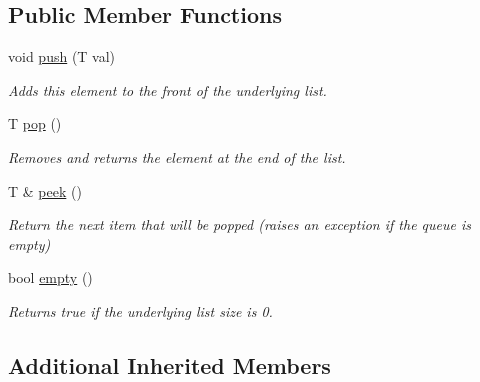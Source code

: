 \subsection*{Public Member Functions}
\begin{DoxyCompactItemize}
\item 
\mbox{\label{classssuds_1_1_queue_a6b7fb3efa5a83edba42e034dc378962f}} 
void \mbox{\hyperlink{classssuds_1_1_queue_a6b7fb3efa5a83edba42e034dc378962f}{push}} (T val)
\begin{DoxyCompactList}\small\item\em Adds this element to the front of the underlying list. \end{DoxyCompactList}\item 
\mbox{\label{classssuds_1_1_queue_a3fc08471d690c2d0cca591bc9773b517}} 
T \mbox{\hyperlink{classssuds_1_1_queue_a3fc08471d690c2d0cca591bc9773b517}{pop}} ()
\begin{DoxyCompactList}\small\item\em Removes and returns the element at the end of the list. \end{DoxyCompactList}\item 
\mbox{\label{classssuds_1_1_queue_a805e78bc8e4ba73d0fa35e387917cbf8}} 
T \& \mbox{\hyperlink{classssuds_1_1_queue_a805e78bc8e4ba73d0fa35e387917cbf8}{peek}} ()
\begin{DoxyCompactList}\small\item\em Return the next item that will be popped (raises an exception if the queue is empty) \end{DoxyCompactList}\item 
\mbox{\label{classssuds_1_1_queue_a64a3f334fd662d689ebf97e409743ec9}} 
bool \mbox{\hyperlink{classssuds_1_1_queue_a64a3f334fd662d689ebf97e409743ec9}{empty}} ()
\begin{DoxyCompactList}\small\item\em Returns true if the underlying list size is 0. \end{DoxyCompactList}\end{DoxyCompactItemize}
\subsection*{Additional Inherited Members}



